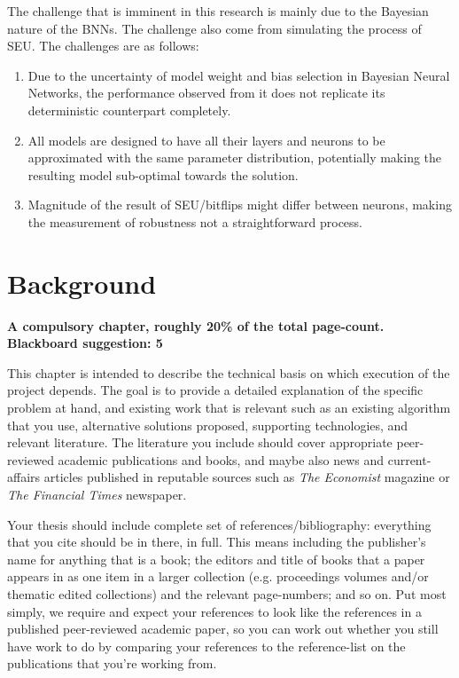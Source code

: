 \documentclass[ %
                    author={Revalda Putawara},
                supervisor={Dr. James Pope},
                    degree={MSc},
                     title={Robustness of Bayesian Neural Networks Design Choices Against Weight and Bias Perturbation Induced by Single Event Upsets (SEUs)},
                      type={},
                      year={2025}]{dissertation}
\begin{document}
The challenge that is imminent in this research is mainly due to the Bayesian nature of the BNNs. The challenge also come from simulating the process of SEU. The challenges are as follows:
\begin{enumerate}
\item Due to the uncertainty of model weight and bias selection in Bayesian Neural Networks, the performance observed from it does not replicate its deterministic counterpart completely.
\item All models are designed to have all their layers and neurons to be approximated with the same parameter distribution, potentially making the resulting model sub-optimal towards the solution.
\item Magnitude of the result of SEU/bitflips might differ between neurons, making the measurement of robustness not a straightforward process.
\end{enumerate}

\chapter{Background}
\label{chap:background}

\iffalse
{\bf A compulsory chapter, roughly 20\% of the total page-count. Blackboard suggestion: 5}
\vspace{1cm} 

\noindent
This chapter is intended to describe the technical basis on which execution
of the project depends.  The goal is to provide a detailed explanation of
the specific problem at hand, and existing work that is relevant such as an
existing algorithm that you use, alternative solutions proposed, supporting
technologies, and relevant literature. The literature you include should cover 
appropriate peer-reviewed academic publications and books, and maybe also 
news and current-affairs articles published in reputable sources such as 
{\em The Economist} magazine or {\em The Financial Times} newspaper. 

Your thesis should include complete set of references/bibliography: everything that you cite should be in there, in full. This means including the publisher's name for anything that is a book; the editors and title of books that a paper appears in as one item in a larger collection (e.g. proceedings volumes and/or thematic edited collections) and the relevant page-numbers; and so on. Put most simply, we require and expect your references to look like the references in a published peer-reviewed academic paper, so you can work out whether you still have work to do by comparing your references to the reference-list on the publications that you're working from. 
\end{document}

